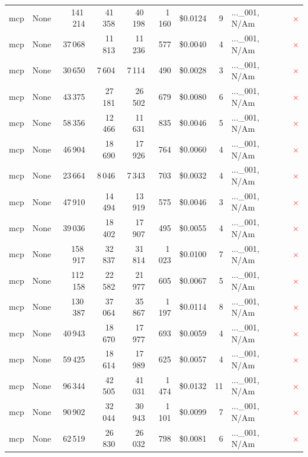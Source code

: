 \documentclass[a4paper,11pt]{article}
\begin{document}
\begin{table}[H]
{\begin{tabular}{l r r r r r r r l c}
mcp & None & 141\,214 & 41\,358 & 40\,198 & 1\,160 & \$0.0124 & 9 & ...\_001, N/Am & \textcolor{red}{\(\times\)} \\
mcp & None & 37\,068 & 11\,813 & 11\,236 & 577 & \$0.0040 & 4 & ...\_001, N/Am & \textcolor{red}{\(\times\)} \\
mcp & None & 30\,650 & 7\,604 & 7\,114 & 490 & \$0.0028 & 3 & ...\_001, N/Am & \textcolor{red}{\(\times\)} \\
mcp & None & 43\,375 & 27\,181 & 26\,502 & 679 & \$0.0080 & 6 & ...\_001, N/Am & \textcolor{red}{\(\times\)} \\
mcp & None & 58\,356 & 12\,466 & 11\,631 & 835 & \$0.0046 & 5 & ...\_001, N/Am & \textcolor{red}{\(\times\)} \\
mcp & None & 46\,904 & 18\,690 & 17\,926 & 764 & \$0.0060 & 4 & ...\_001, N/Am & \textcolor{red}{\(\times\)} \\
mcp & None & 23\,664 & 8\,046 & 7\,343 & 703 & \$0.0032 & 4 & ...\_001, N/Am & \textcolor{red}{\(\times\)} \\
mcp & None & 47\,910 & 14\,494 & 13\,919 & 575 & \$0.0046 & 3 & ...\_001, N/Am & \textcolor{red}{\(\times\)} \\
mcp & None & 39\,036 & 18\,402 & 17\,907 & 495 & \$0.0055 & 4 & ...\_001, N/Am & \textcolor{red}{\(\times\)} \\
mcp & None & 158\,917 & 32\,837 & 31\,814 & 1\,023 & \$0.0100 & 7 & ...\_001, N/Am & \textcolor{red}{\(\times\)} \\
mcp & None & 112\,158 & 22\,582 & 21\,977 & 605 & \$0.0067 & 5 & ...\_001, N/Am & \textcolor{red}{\(\times\)} \\
mcp & None & 130\,387 & 37\,064 & 35\,867 & 1\,197 & \$0.0114 & 8 & ...\_001, N/Am & \textcolor{red}{\(\times\)} \\
mcp & None & 40\,943 & 18\,670 & 17\,977 & 693 & \$0.0059 & 4 & ...\_001, N/Am & \textcolor{red}{\(\times\)} \\
mcp & None & 59\,425 & 18\,614 & 17\,989 & 625 & \$0.0057 & 4 & ...\_001, N/Am & \textcolor{red}{\(\times\)} \\
mcp & None & 96\,344 & 42\,505 & 41\,031 & 1\,474 & \$0.0132 & 11 & ...\_001, N/Am & \textcolor{red}{\(\times\)} \\
mcp & None & 90\,902 & 32\,044 & 30\,943 & 1\,101 & \$0.0099 & 7 & ...\_001, N/Am & \textcolor{red}{\(\times\)} \\
mcp & None & 62\,519 & 26\,830 & 26\,032 & 798 & \$0.0081 & 6 & ...\_001, N/Am & \textcolor{red}{\(\times\)} \\

\end{tabular}}
\end{table}
\end{document}
